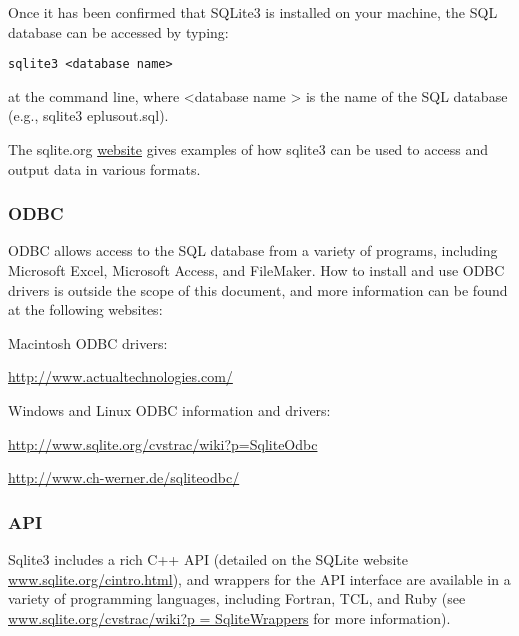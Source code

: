 Once it has been confirmed that SQLite3 is installed on your machine, the SQL database can be accessed by typing:

\begin{lstlisting}
sqlite3 <database name>
\end{lstlisting}

at the command line, where \textless{}database name \textgreater{} is the name of the SQL database (e.g., sqlite3 eplusout.sql).

The sqlite.org \href{http://www.sqlite.org/sqlite.html}{website} gives examples of how sqlite3 can be used to access and output data in various formats.

\subsubsection{ODBC}\label{odbc}

ODBC allows access to the SQL database from a variety of programs, including Microsoft Excel, Microsoft Access, and FileMaker. How to install and use ODBC drivers is outside the scope of this document, and more information can be found at the following websites:

Macintosh ODBC drivers:

\url{http://www.actualtechnologies.com/}

Windows and Linux ODBC information and drivers:

\url{http://www.sqlite.org/cvstrac/wiki?p=SqliteOdbc}

\url{http://www.ch-werner.de/sqliteodbc/}

\subsubsection{API}\label{api}

Sqlite3 includes a rich C++ API (detailed on the SQLite website \href{http://www.sqlite.org/cintro.html}{www.sqlite.org/cintro.html}), and wrappers for the API interface are available in a variety of programming languages, including Fortran, TCL, and Ruby (see \href{http://www.sqlite.org/cvstrac/wiki?p\%20=\%20SqliteWrappers}{www.sqlite.org/cvstrac/wiki?p = SqliteWrappers} for more information).
